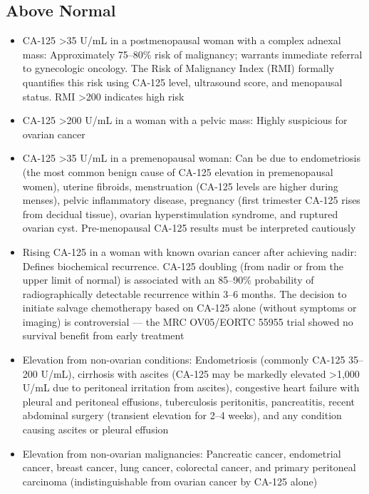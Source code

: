 \subsection*{Above Normal}
\begin{itemize}
  \item CA-125 >35 U/mL in a postmenopausal woman with a complex adnexal mass: Approximately 75--80\% risk of malignancy; warrants immediate referral to gynecologic oncology. The Risk of Malignancy Index (RMI) formally quantifies this risk using CA-125 level, ultrasound score, and menopausal status. RMI >200 indicates high risk
  \item CA-125 >200 U/mL in a woman with a pelvic mass: Highly suspicious for ovarian cancer
  \item CA-125 >35 U/mL in a premenopausal woman: Can be due to endometriosis (the most common benign cause of CA-125 elevation in premenopausal women), uterine fibroids, menstruation (CA-125 levels are higher during menses), pelvic inflammatory disease, pregnancy (first trimester CA-125 rises from decidual tissue), ovarian hyperstimulation syndrome, and ruptured ovarian cyst. Pre-menopausal CA-125 results must be interpreted cautiously
  \item Rising CA-125 in a woman with known ovarian cancer after achieving nadir: Defines biochemical recurrence. CA-125 doubling (from nadir or from the upper limit of normal) is associated with an 85--90\% probability of radiographically detectable recurrence within 3--6 months. The decision to initiate salvage chemotherapy based on CA-125 alone (without symptoms or imaging) is controversial --- the MRC OV05/EORTC 55955 trial showed no survival benefit from early treatment
  \item Elevation from non-ovarian conditions: Endometriosis (commonly CA-125 35--200 U/mL), cirrhosis with ascites (CA-125 may be markedly elevated >1,000 U/mL due to peritoneal irritation from ascites), congestive heart failure with pleural and peritoneal effusions, tuberculosis peritonitis, pancreatitis, recent abdominal surgery (transient elevation for 2--4 weeks), and any condition causing ascites or pleural effusion
  \item Elevation from non-ovarian malignancies: Pancreatic cancer, endometrial cancer, breast cancer, lung cancer, colorectal cancer, and primary peritoneal carcinoma (indistinguishable from ovarian cancer by CA-125 alone)
\end{itemize}

